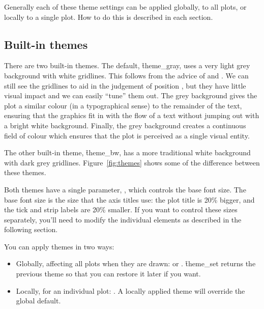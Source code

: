 \noindent Generally each of these theme settings can be applied globally, to all plots, or locally to a single plot.  How to do this is described in each section.

\subsection{Built-in themes}
\label{sec:built_in}

There are two built-in themes.  The default, \f{theme_gray}, uses a very light grey background with white gridlines.  This follows from the advice of \citet{tufte:2006,tufte:1990,tufte:2001,tufte:1997} and \citet{brewer:1994,carr:2002,carr:1994,carr:1999}. We can still see the gridlines to aid in the judgement of position \citep{cleveland:1993a}, but they have little visual impact and we can easily ``tune'' them out. The grey background gives the plot a similar colour (in a typographical sense) to the remainder of the text, ensuring that the graphics fit in with the flow of a text without jumping out with a bright white background. Finally, the grey background creates a continuous field of colour which ensures that the plot is perceived as a single visual entity. 

The other built-in theme, \f{theme_bw}, has a more traditional white background with dark grey gridlines.  Figure~\ref{fig:themes} shows some of the difference between these themes.   

Both themes have a single parameter, , which controls the base font size.  The base font size is the size that the axis titles use: the plot title is 20\% bigger, and the tick and strip labels are 20\% smaller.  If you want to control these sizes separately, you'll need to modify the individual elements as described in the following section.

You can apply themes in two ways:

\begin{itemize}
  \item Globally, affecting all plots when they are drawn:  or .  \f{theme_set} returns the previous theme so that you can restore it later if you want. 
  
  \item Locally, for an individual plot:  .  A locally applied theme will override the global default. 
\end{itemize}

